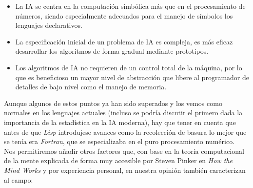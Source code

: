 \begin{itemize}
  \item La IA se centra en la computación simbólica más que en el procesamiento de números, siendo especialmente adecuados para el manejo de símbolos los lenguajes declarativos.\\
  
  \item La especificación inicial de un problema de IA es compleja, es más eficaz desarrollar los algoritmos de forma gradual mediante prototipos.\\
  
  \item Los algoritmos de IA no requieren de un control total de la máquina, por lo que es beneficioso un mayor nivel de abstracción que libere al programador de detalles de bajo nivel como el manejo de memoria.\\
\end{itemize}

Aunque algunos de estos puntos ya han sido superados y los vemos como normales en los lenguajes actuales (incluso se podría discutir el primero dada la importancia de la estadística en la IA moderna), hay que tener en cuenta que antes de que \textit{Lisp} introdujese avances como la recolección de basura lo mejor que se tenía era \textit{Fortran}, que se especializaba en el puro procesamiento numérico.\\

Nos permitiremos añadir otros factores que, con base en la teoría computacional de la mente explicada de forma muy accesible por Steven Pinker en \textit{How the Mind Works} \cite{how_mind_works} y por experiencia personal, en nuestra opinión también caracterizan al campo:\\

